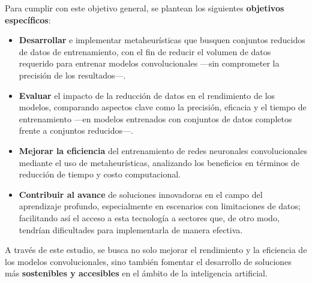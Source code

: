 Para cumplir con este objetivo general, se plantean los siguientes \textbf{objetivos específicos}:

\begin{itemize}
      \item \textbf{Desarrollar} e implementar metaheurísticas que busquen conjuntos reducidos de datos de
            entrenamiento, con el fin de reducir el volumen de datos requerido para entrenar modelos convolucionales —sin
            comprometer la precisión de los resultados—.
      \item \textbf{Evaluar} el impacto de la reducción de datos en el rendimiento de los modelos, comparando aspectos
            clave como la precisión, eficacia y el tiempo de entrenamiento —en modelos entrenados con conjuntos de datos completos
            frente a conjuntos reducidos—.
      \item \textbf{Mejorar la eficiencia} del entrenamiento de redes neuronales convolucionales mediante el uso de
            metaheurísticas, analizando los beneficios en términos de reducción de tiempo y costo computacional.
      \item \textbf{Contribuir al avance} de soluciones innovadoras en el campo del aprendizaje profundo, especialmente
            en escenarios con limitaciones de datos; facilitando así el acceso a esta tecnología a sectores que, de otro modo,
            tendrían dificultades para implementarla de manera efectiva.
\end{itemize}


A través de este estudio, se busca no solo mejorar el rendimiento y la eficiencia de los modelos convolucionales, sino
también fomentar el desarrollo de soluciones más \textbf{sostenibles y accesibles} en el ámbito de la inteligencia
artificial.
